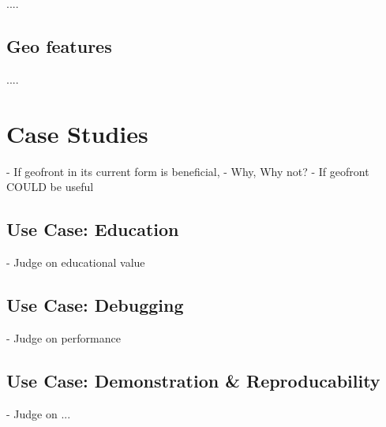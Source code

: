....

\subsection{Geo features}

....

\section{ Case Studies } 
- If geofront in its current form is beneficial,
  - Why, Why not?
- If geofront COULD be useful

\subsection{Use Case: Education}%
- Judge on educational value

\subsection{Use Case: Debugging}%
- Judge on performance

\subsection{Use Case: Demonstration \& Reproducability}%
- Judge on ... 